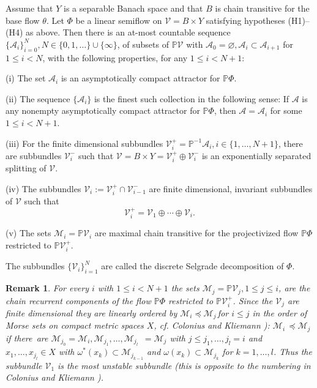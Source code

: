 \documentclass{siamltex}%
\newtheorem{remark}[theorem]{Remark}
\begin{document}
\begin{theorem}
\label{Theorem_Selgrade1}Assume that $Y$ is a separable Banach space and that
$B$ is chain transitive for the base flow $\theta$. Let $\Phi$ be a linear
semiflow on $\mathcal{V}=B\times Y$ satisfying hypotheses (H1)--(H4) as above.
Then there is an at-most countable sequence $\{\mathcal{A}_{i}\}_{i=0}%
^{N},\allowbreak N\in\{0,1,\ldots\}\cup\{\infty\}$, of subsets of
$\mathbb{P}\mathcal{V}$ with $\mathcal{A}_{0}=\varnothing,\mathcal{A}%
_{i}\subset\mathcal{A}_{i+1}$ for $1\leq i<N$, with the following properties,
for any $1\leq i<N+1$:

(i) The set $\mathcal{A}_{i}$ is an asymptotically compact attractor for
$\mathbb{P}\Phi$.

(ii) The sequence $\{\mathcal{A}_{i}\}$ is the finest such collection in the
following sense: If $\mathcal{A}$ is any nonempty asymptotically compact
attractor for $\mathbb{P}\Phi$, then $\mathcal{A}=\mathcal{A}_{i}$ for some
$1\leq i<N+1$.

(iii) For the finite dimensional subbundles $\mathcal{V}_{i}^{+}%
=\mathbb{P}^{-1}\mathcal{A}_{i},i\in\{1,\ldots,N+1\}$, there are subbundles
$\mathcal{V}_{i}^{-}$ such that $\mathcal{V}=B\times Y=\mathcal{V}_{i}%
^{+}\oplus\mathcal{V}_{i}^{-}$ is an exponentially separated splitting of
$\mathcal{V}$.

(iv) The subbundles $\mathcal{V}_{i}:=\mathcal{V}_{i}^{+}\cap\mathcal{V}%
_{i-1}^{-}$ are finite dimensional, invariant subbundles of $\mathcal{V}$ such
that%
\[
\mathcal{V}_{i}^{+}=\mathcal{V}_{1}\oplus\cdots\oplus\mathcal{V}_{i}.
\]


(v) The sets $\mathcal{M}_{i}=\mathbb{P}\mathcal{V}_{i}$ are maximal chain
transitive for the projectivized flow $\mathbb{P}\Phi$ restricted to
$\mathbb{P}\mathcal{V}_{i}^{+}$.
\end{theorem}

The subbundles $\{\mathcal{V}_{i}\}_{i=1}^{N}$ are called the discrete
Selgrade decomposition of $\Phi$.

\begin{remark}
\label{Remark_order}For every $i$ with $1\leq i<N+1$ the sets $\mathcal{M}%
_{j}=\mathbb{P}\mathcal{V}_{j},1\leq j\leq i$, are the chain recurrent
components of the flow $\mathbb{P}\Phi$ restricted to $\mathbb{P}%
\mathcal{V}_{i}^{+}$. Since the $\mathcal{V}_{j}$ are finite dimensional they
are linearly ordered by $\mathcal{M}_{i}\preceq\mathcal{M}_{j}\,$for $i\leq j$
in the order of Morse sets on compact metric spaces $X$, cf. Colonius and
Kliemann \cite[Proposition B.2.8]{ColK00}): $\mathcal{M}_{i}\,\preceq
\mathcal{M}_{j}$ if there\ are $\mathcal{M}_{j_{0}}=\mathcal{M}_{i}%
,\mathcal{M}_{j_{1}},\ldots,\mathcal{M}_{j_{l}\text{ }}=\mathcal{M}_{j}$ with
$j\leq j_{1},\ldots,j_{l}=i$ and $x_{1},\allowbreak\ldots,x_{j_{l}}\in X$ with
$\omega^{\ast}(x_{k})\subset\mathcal{M}_{j_{k-1}}$ and $\omega(x_{k}%
)\subset\mathcal{M}_{j_{k}}$ for $k=1,\ldots,l$. Thus the subbundle
$\mathcal{V}_{1}$ is the most unstable subbundle (this is opposite to the
numbering in Colonius and Kliemann \cite[Theorem 5.1.4]{ColK00}).
\end{remark}
\end{document}
